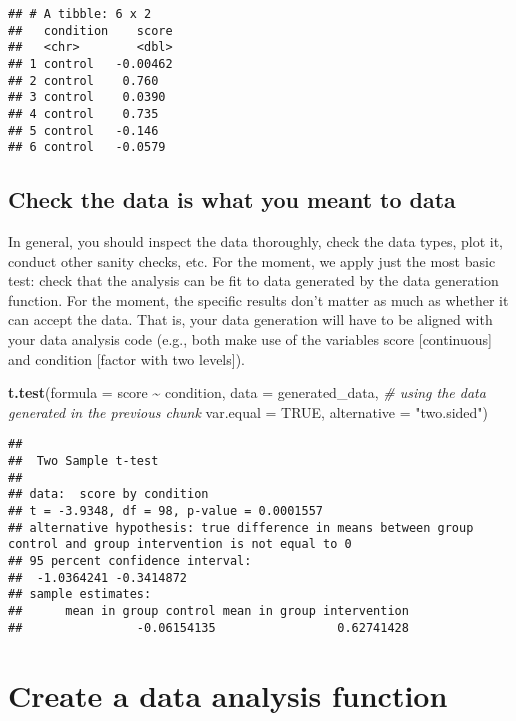 \documentclass[
]{article}
\newenvironment{Shaded}{\begin{snugshade}}{\end{snugshade}}
\newcommand{\AttributeTok}[1]{\textcolor[rgb]{0.13,0.29,0.53}{#1}}
\newcommand{\CommentTok}[1]{\textcolor[rgb]{0.56,0.35,0.01}{\textit{#1}}}
\newcommand{\ConstantTok}[1]{\textcolor[rgb]{0.56,0.35,0.01}{#1}}
\newcommand{\FunctionTok}[1]{\textcolor[rgb]{0.13,0.29,0.53}{\textbf{#1}}}
\newcommand{\NormalTok}[1]{#1}
\newcommand{\SpecialCharTok}[1]{\textcolor[rgb]{0.81,0.36,0.00}{\textbf{#1}}}
\newcommand{\StringTok}[1]{\textcolor[rgb]{0.31,0.60,0.02}{#1}}
\begin{document}
\begin{verbatim}
## # A tibble: 6 x 2
##   condition    score
##   <chr>        <dbl>
## 1 control   -0.00462
## 2 control    0.760  
## 3 control    0.0390 
## 4 control    0.735  
## 5 control   -0.146  
## 6 control   -0.0579
\end{verbatim}

\hypertarget{check-the-data-is-what-you-meant-to-data}{%
\subsection{Check the data is what you meant to
data}\label{check-the-data-is-what-you-meant-to-data}}

In general, you should inspect the data thoroughly, check the data
types, plot it, conduct other sanity checks, etc. For the moment, we
apply just the most basic test: check that the analysis can be fit to
data generated by the data generation function. For the moment, the
specific results don't matter as much as whether it can accept the data.
That is, your data generation will have to be aligned with your data
analysis code (e.g., both make use of the variables score
{[}continuous{]} and condition {[}factor with two levels{]}).

\begin{Shaded}
\begin{Highlighting}[]
\FunctionTok{t.test}\NormalTok{(}\AttributeTok{formula =}\NormalTok{ score }\SpecialCharTok{\textasciitilde{}}\NormalTok{ condition, }
       \AttributeTok{data =}\NormalTok{ generated\_data, }\CommentTok{\# using the data generated in the previous chunk}
       \AttributeTok{var.equal =} \ConstantTok{TRUE}\NormalTok{,}
       \AttributeTok{alternative =} \StringTok{"two.sided"}\NormalTok{)}
\end{Highlighting}
\end{Shaded}

\begin{verbatim}
## 
##  Two Sample t-test
## 
## data:  score by condition
## t = -3.9348, df = 98, p-value = 0.0001557
## alternative hypothesis: true difference in means between group control and group intervention is not equal to 0
## 95 percent confidence interval:
##  -1.0364241 -0.3414872
## sample estimates:
##      mean in group control mean in group intervention 
##                -0.06154135                 0.62741428
\end{verbatim}

\hypertarget{create-a-data-analysis-function}{%
\section{Create a data analysis
function}\label{create-a-data-analysis-function}}
\end{document}
